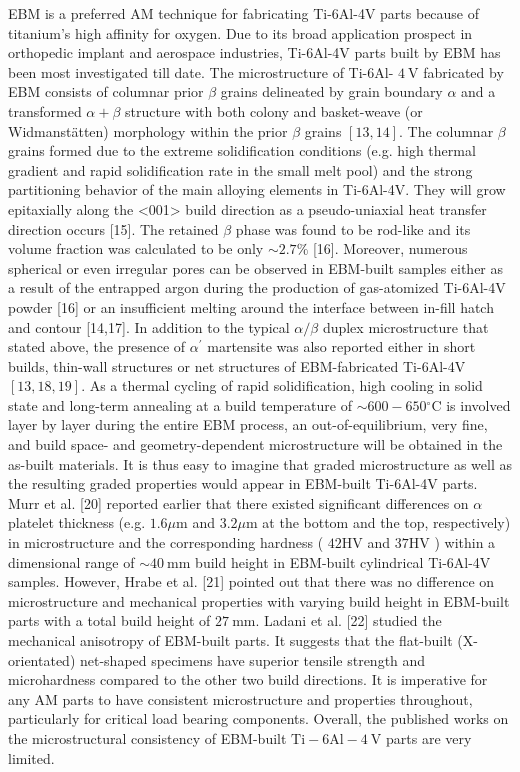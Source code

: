 \documentclass[10pt]{article}
\begin{document}
EBM is a preferred AM technique for fabricating Ti-6Al-4V parts because of titanium's high affinity for oxygen. Due to its broad application prospect in orthopedic implant and aerospace industries, Ti-6Al-4V parts built by EBM has been most investigated till date. The microstructure of Ti-6Al- $4 \mathrm{~V}$ fabricated by EBM consists of columnar prior $\beta$ grains delineated by grain boundary $\alpha$ and a transformed $\alpha+\beta$ structure with both colony and basket-weave (or Widmanstätten) morphology within the prior $\beta$ grains $[13,14]$. The columnar $\beta$ grains formed due to the extreme solidification conditions (e.g. high thermal gradient and rapid solidification rate in the small melt pool) and the strong partitioning behavior of the main alloying elements in Ti-6Al-4V. They will grow epitaxially along the <001> build direction as a pseudo-uniaxial heat transfer direction occurs [15]. The retained $\beta$ phase was found to be rod-like and its volume fraction was calculated to be only $\sim 2.7 \%$ [16]. Moreover, numerous spherical or even irregular pores can be observed in EBM-built samples either as a result of the entrapped argon during the production of gas-atomized Ti-6Al-4V powder [16] or an insufficient melting around the interface between in-fill hatch and contour [14,17]. In addition to the typical $\alpha / \beta$ duplex microstructure that stated above, the presence of $\alpha^{\prime}$ martensite was also reported either in short builds, thin-wall structures or net structures of EBM-fabricated Ti-6Al-4V $[13,18,19]$. As a thermal cycling of rapid solidification, high cooling in solid state and long-term annealing at a build temperature of $\sim 600-650{ }^{\circ} \mathrm{C}$ is involved layer by layer during the entire EBM process, an out-of-equilibrium, very fine, and build space- and geometry-dependent microstructure will be obtained in the as-built materials. It is thus easy to imagine that graded microstructure as well as the resulting graded properties would appear in EBM-built Ti-6Al-4V parts. Murr et al. [20] reported earlier that there existed significant differences on $\alpha$ platelet thickness (e.g. $1.6 \mu \mathrm{m}$ and $3.2 \mu \mathrm{m}$ at the bottom and the top, respectively) in microstructure and the corresponding hardness ( $42 \mathrm{HV}$ and $37 \mathrm{HV}$ ) within a dimensional range of $\sim 40 \mathrm{~mm}$ build height in EBM-built cylindrical Ti-6Al-4V samples. However, Hrabe et al. [21] pointed out that there was no difference on microstructure and mechanical properties with varying build height in EBM-built parts with a total build height of $27 \mathrm{~mm}$. Ladani et al. [22] studied the mechanical anisotropy of EBM-built parts. It suggests that the flat-built (X-orientated) net-shaped specimens have superior tensile strength and microhardness compared to the other two build directions. It is imperative for any AM parts to have consistent microstructure and properties throughout, particularly for critical load bearing components. Overall, the published works on the microstructural consistency of EBM-built $\mathrm{Ti}-6 \mathrm{Al}-4 \mathrm{~V}$ parts are very limited.
\end{document}
